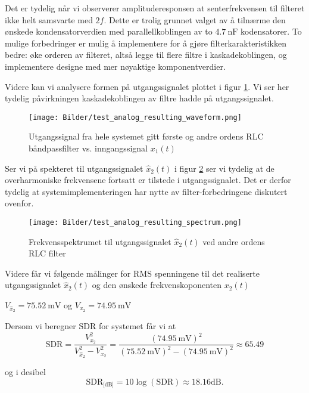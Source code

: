 Det er tydelig når vi observerer amplituderesponsen at senterfrekvensen til filteret ikke helt samsvarte med 
$2f$. Dette er trolig grunnet valget av å tilnærme den ønskede kondensatorverdien med parallellkoblingen av to $\SI{4.7}{\nano\farad}$ kodensatorer.
To mulige forbedringer er mulig å implementere for å gjøre filterkarakteristikken bedre: øke orderen av filteret, altså legge til flere filtre i kaskadekoblingen,
og implementere designe med mer nøyaktige komponentverdier. 

Videre kan vi analysere formen på utgangssignalet plottet i figur \ref{fig:test_analog_resulting_waveform}. Vi ser her 
tydelig påvirkningen kaskadekoblingen av filtre hadde på utgangssignalet. 

\begin{figure}[H]
    \centering 
    \texttt{[image: Bilder/test\_analog\_resulting\_waveform.png]}
    \caption{Utgangssignal fra hele systemet gitt første og andre ordens RLC båndpassfilter vs. inngangssignal $x_1(t)$}
    \label{fig:test_analog_resulting_waveform}
\end{figure}

Ser vi på spekteret til utgangssignalet $\hat{x}_2(t)$ i figur \ref{fig:test_analog_resulting_spectrum} ser vi tydelig at de overharmoniske frekvensene fortsatt er 
tilstede i utgangssignalet. Det er derfor tydelig at systemimplementeringen har nytte av filter-forbedringene diskutert ovenfor.

\begin{figure}[H]
    \centering 
    \texttt{[image: Bilder/test\_analog\_resulting\_spectrum.png]}
    \caption{Frekvensspektrumet til utgangssignalet $\hat{x}_2(t)$ ved andre ordens RLC filter}
    \label{fig:test_analog_resulting_spectrum}
\end{figure}

Videre får vi følgende målinger for RMS spenningene til det realiserte utgangssignalet $\hat{x}_2(t)$ og 
den ønskede frekvenskoponenten $x_2(t)$
\begin{center}
    $V_{\hat{x}_2} = \SI{75,52}{\milli\volt}$ og $V_{x_2} = \SI{74.95}{\milli\volt}$
\end{center}

Dersom vi beregner SDR for systemet får vi at 
\[
    \text{SDR} = \frac{V_{x_2}^2}{V_{\hat{x}_2}^2 - V_{x_2}^2} = \frac{(\SI{74.95}{\milli\volt})^2}{(\SI{75.52}{\milli\volt})^2 - (\SI{74.95}{\milli\volt})^2} \approx 65.49
\]

og i desibel
\[
    \text{SDR}_\text{{[dB]}} = 10\log{(\text{SDR})} \approx 18.16\text{dB.}
\]

